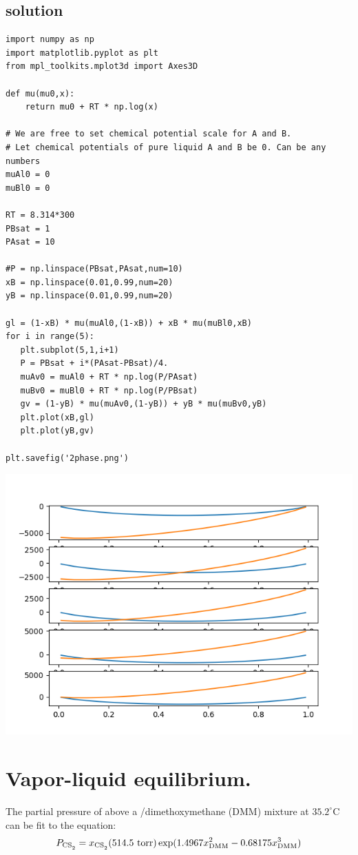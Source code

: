 \documentclass[11pt]{article}
\begin{document}
\subsection{solution}
\label{sec:org86cef3b}
\begin{verbatim}
import numpy as np
import matplotlib.pyplot as plt
from mpl_toolkits.mplot3d import Axes3D

def mu(mu0,x):
    return mu0 + RT * np.log(x)

# We are free to set chemical potential scale for A and B.
# Let chemical potentials of pure liquid A and B be 0. Can be any numbers
muAl0 = 0
muBl0 = 0

RT = 8.314*300
PBsat = 1
PAsat = 10

#P = np.linspace(PBsat,PAsat,num=10)
xB = np.linspace(0.01,0.99,num=20)
yB = np.linspace(0.01,0.99,num=20)

gl = (1-xB) * mu(muAl0,(1-xB)) + xB * mu(muBl0,xB)
for i in range(5):
   plt.subplot(5,1,i+1)
   P = PBsat + i*(PAsat-PBsat)/4.
   muAv0 = muAl0 + RT * np.log(P/PAsat)
   muBv0 = muBl0 + RT * np.log(P/PBsat)
   gv = (1-yB) * mu(muAv0,(1-yB)) + yB * mu(muBv0,yB)
   plt.plot(xB,gl)
   plt.plot(yB,gv)

plt.savefig('2phase.png')
\end{verbatim}

\begin{center}
\includegraphics[width=.9\linewidth]{./2phase.png}
\end{center}

\section{Vapor-liquid equilibrium.}
\label{sec:orgea8202e}
The partial pressure of  above a
  /dimethoxymethane (DMM) mixture at \(35.2^\circ\)C can be fit to the equation:
\begin{equation*}
  P_{\ce{CS2}} = x_{\ce{CS2}} (514.5~\text{torr}) \exp ( 1.4967 x_{\text{DMM}}^2 - 0.68175 x_{\text{DMM}}^3)
\end{equation*}
\end{document}

